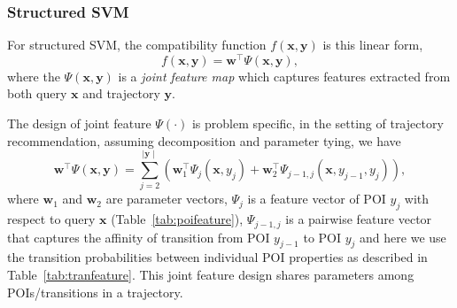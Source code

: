 \documentclass[twocolumn,9pt]{extarticle}
\begin{document}
\subsubsection{Structured SVM}
\label{sec:ssvm}

For structured SVM, the compatibility function $f(\mathbf{x}, \mathbf{y})$ is this linear form,
\begin{equation*}
f(\mathbf{x}, \mathbf{y}) = \mathbf{w}^\top \Psi(\mathbf{x}, \mathbf{y}),
\end{equation*}
where the $\Psi(\mathbf{x}, \mathbf{y})$ is a \emph{joint feature map} 
which captures features extracted from both query $\mathbf{x}$ and trajectory $\mathbf{y}$.

The design of joint feature $\Psi(\cdot)$ is problem specific, 
in the setting of trajectory recommendation,
assuming decomposition and parameter tying, we have
\begin{equation*}
\label{eq:jointfeature}
\mathbf{w}^\top \Psi(\mathbf{x}, \mathbf{y}) = \sum_{j=2}^{\mid \mathbf{y} \mid} 
                                               \left( \mathbf{w}_1^\top \Psi_j(\mathbf{x}, y_j) + 
                                                      \mathbf{w}_2^\top \Psi_{j-1, j}(\mathbf{x}, y_{j-1}, y_j) \right),
\end{equation*}
where $\mathbf{w}_1$ and $\mathbf{w}_2$ are parameter vectors,
$\Psi_j$ is a feature vector of POI $y_j$ with respect to query $\mathbf{x}$ (Table~\ref{tab:poifeature}),
$\Psi_{j-1,j}$ is a pairwise feature vector that captures the affinity of transition from POI $y_{j-1}$ to POI $y_j$ and
here we use the transition probabilities between individual POI properties as described in Table~\ref{tab:tranfeature}.
This joint feature design shares parameters among POIs/transitions in a trajectory.
\end{document}

